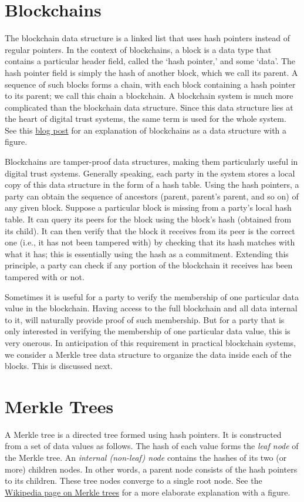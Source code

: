 \documentclass{article}
\begin{document}
\section*{Blockchains}
The blockchain data structure is a linked list that uses hash pointers instead of regular pointers. In the context of blockchains, a block is a data type that contains a particular header field, called the ‘hash pointer,’ and some ‘data’. The hash pointer field is simply the hash of another block, which we call its parent. A sequence of such blocks forms a chain, with each block containing a hash pointer to its parent; we call this chain a blockchain. A blockchain system is much more complicated than the blockchain data structure. Since this data structure lies at the heart of digital trust systems, the same term is used for the whole system. See this \href{https://medium.com/@zhaohuabing/hash-pointers-and-data-structures-f85d5fe91659}{blog post} for an explanation of blockchains as a data structure with a figure.

Blockchains are tamper-proof data structures, making them particularly useful in digital trust systems. Generally speaking, each party in the system stores a local copy of this data structure in the form of a hash table. Using the hash pointers, a party can obtain the sequence of ancestors (parent, parent’s parent, and so on) of any given block. Suppose a particular block is missing from a party’s local hash table. It can query its peers for the block using the block’s hash (obtained from its child). It can then verify that the block it receives from its peer is the correct one (i.e., it has not been tampered with) by checking that its hash matches with what it has; this is essentially using the hash as a commitment. Extending this principle, a party can check if any portion of the blockchain it receives has been tampered with or not.

Sometimes it is useful for a party to verify the membership of one particular data value in the blockchain. Having access to the full blockchain and all data internal to it, will naturally provide proof of such membership. But for a party that is only interested in verifying the membership of one particular data value, this is very onerous. In anticipation of this requirement in practical blockchain systems, we consider a Merkle tree data structure to organize the data inside each of the blocks. This is discussed next. 

\section*{Merkle Trees}
A Merkle tree is a directed tree formed using hash pointers. It is constructed from a set of data values as follows. The hash of each value forms the \textit{leaf node} of the Merkle tree. An \textit{internal (non-leaf) node} contains the hashes of its two (or more) children nodes. In other words, a parent node consists of the hash pointers to its children. These tree nodes converge to a single root node. See the \href{https://en.wikipedia.org/wiki/Merkle_tree}{Wikipedia page on Merkle trees} for a more elaborate explanation with a figure.
\end{document}
